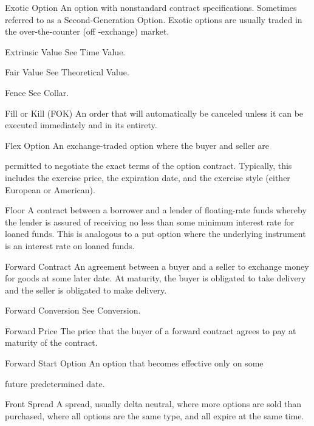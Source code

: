 Exotic Option An option with nonstandard contract specifications. Sometimes referred to as a Second-Generation Option. Exotic options are usually traded in the over-the-counter (off -exchange) market.\par
Extrinsic Value See Time Value.\par
Fair Value See Theoretical Value.\par
Fence See Collar.\par
Fill or Kill (FOK) An order that will automatically be canceled unless it can be executed immediately and in its entirety.\par
Flex Option An exchange-traded option where the buyer and seller are\par
permitted to negotiate the exact terms of the option contract. Typically, this includes the exercise price, the expiration date, and the exercise style (either European or American).\par
Floor A contract between a borrower and a lender of floating-rate funds whereby the lender is assured of receiving no less than some minimum interest rate for loaned funds. This is analogous to a put option where the underlying instrument is an interest rate on loaned funds.\par
Forward Contract An agreement between a buyer and a seller to exchange money for goods at some later date. At maturity, the buyer is obligated to take delivery and the seller is obligated to make delivery.\par
Forward Conversion See Conversion.\par
Forward Price The price that the buyer of a forward contract agrees to pay at maturity of the contract.\par
Forward Start Option An option that becomes effective only on some\par
future predetermined date.\par
Front Spread A spread, usually delta neutral, where more options are sold than purchased, where all options are the same type, and all expire at the same time.\par

